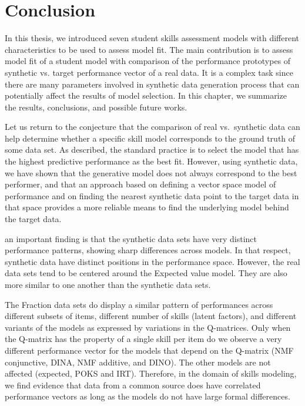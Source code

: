 \label{sec:Conclusion}

\section{Conclusion}
In this thesis, we introduced seven student skills assessment models with different characteristics to be used to assess model fit. The main contribution is to assess model fit of a student model with comparison of the performance prototypes of synthetic vs. target performance vector of a real data. It is a complex task since there are many parameters involved in synthetic data generation process that can potentially affect the results of model selection. In this chapter, we summarize the results, conclusions, and possible future works.



Let us return to the conjecture that the comparison of real vs.\ synthetic data can help determine whether a specific skill model corresponds to the ground truth of some data set. As described, the standard practice is to select the model that has the highest predictive performance as the best fit.  However, using synthetic data, we have shown that the generative model does not always correspond to the best performer, and that an approach based on defining a vector space model of performance and on finding the nearest synthetic data point to the target data in that space provides a more reliable means to find the underlying model behind the target data.

an important finding is that the synthetic data sets have very distinct performance patterns, showing sharp differences across models.  In that respect, synthetic data have distinct positions in the performance space. However, the real data sets tend to be centered around the Expected value model.  They are also more similar to one another than the synthetic data sets.


The Fraction data sets do display a similar pattern of performances across different subsets of items, different number of skills (latent factors), and different variants of the models as expressed by variations in the Q-matrices. Only when the Q-matrix has the property of a single skill per item do we observe a very different performance vector for the models that depend on the Q-matrix (NMF conjunctive, DINA, NMF additive, and DINO).  The other models are not affected (expected, POKS and IRT).  Therefore, in the domain of skills modeling, we find evidence that data from a common source does have correlated performance vectors as long as the models do not have large formal differences.

